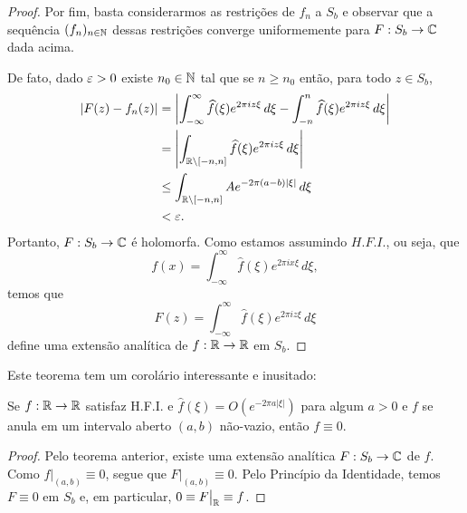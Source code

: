 \begin{proof}
            Por fim, basta considerarmos as restrições de $f_n$ a $S_b$ e observar que a sequência
            $(f_n)_{n\in\mathbb{N}}$ dessas restrições converge uniformemente para $F:S_b\to\mathbb{C}$ dada acima.
            
            De fato, dado $\varepsilon>0$ existe $n_0\in\mathbb{N}$ tal que se $n\geq n_0$ então, para todo $z\in S_b$,
            \begin{align*}
                |F(z) - f_n(z)| &= \left| \int_{-\infty}^{\infty} \widehat{f}(\xi) e^{2\pi iz\xi} \, d\xi -
                \int_{-n}^{n} \widehat{f}(\xi) e^{2\pi iz\xi} \, d\xi \right| \\
                &= \left| \int_{\mathbb{R}\setminus [-n,n]} \widehat{f}(\xi) e^{2\pi iz\xi} \, d\xi \right| \\
                &\leq \int_{\mathbb{R}\setminus [-n,n]} A e^{-2\pi (a-b)|\xi|} \, d\xi \\ 
                &< \varepsilon.
            \end{align*}
            Portanto, $F:S_b\to\mathbb{C}$ é holomorfa. Como estamos assumindo $H.F.I.$, ou seja, que
            \begin{equation*}
                f(x) = \int_{-\infty}^{\infty} \widehat{f}(\xi) e^{2\pi ix\xi} \, d\xi,
            \end{equation*}
            temos que
            \begin{equation*}
                F(z) = \int_{-\infty}^{\infty} \widehat{f}(\xi) e^{2\pi iz\xi} \, d\xi
            \end{equation*}
            define uma extensão analítica de $f:\mathbb{R}\to\mathbb{R}$ em $S_b$.
        \end{proof}
        
        Este teorema tem um corolário interessante e inusitado:
        \begin{corolario}
        \label{corolario-teo-extensao-analitica-transf-decai-exp}
            Se $f:\mathbb{R}\to\mathbb{R}$ satisfaz H.F.I. e $\widehat{f}(\xi) = O(e^{-2\pi a|\xi|})$ para algum $a>0$ 
            e $f$ se anula em um intervalo aberto $(a,b)$ não-vazio, então $f\equiv 0$.
        \end{corolario}
        \begin{proof}
            Pelo teorema anterior, existe uma extensão analítica $F:S_b\to\mathbb{C}$ de $f$. Como
            $f\big|_{(a,b)} \equiv 0$, segue que $F\big|_{(a,b)} \equiv 0$. Pelo Princípio da Identidade,
            temos $F\equiv 0$ em $S_b$ e, em particular, $0 \equiv F\big|_{\mathbb{R}} \equiv f$.
        \end{proof}
        
